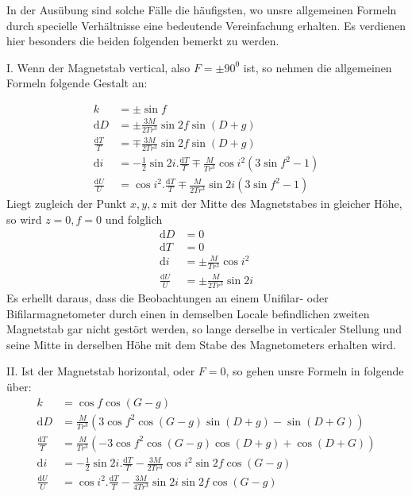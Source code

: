 In der Ausübung sind solche Fälle die häufigsten, wo unsre allgemeinen Formeln durch specielle Verhältnisse eine bedeutende Vereinfachung erhalten. Es verdienen hier besonders die beiden folgenden bemerkt zu werden.

I. Wenn der Magnetstab vertical, also $F=\pm90^0$ ist, so nehmen die allgemeinen Formeln folgende Gestalt an:
\par\clearpage
{}
\[
\begin{aligned}
k&=\pm\sin f\\
\mathrm{d}D&=\pm\frac{3M}{2Tr^3}\sin2f\sin(D+g)\\
\frac{\mathrm{d}T}{T}&=\mp\frac{3M}{2Tr^3}\sin2f\sin(D+g)\\
\mathrm{d}i&=-\tfrac12\sin2i.\frac{\mathrm{d}T}{T}\mp\frac{M}{Tr^3}\cos i^2(3\sin f^2-1)\\
\frac{\mathrm{d}U}{U}&=\cos i^2.\frac{\mathrm{d}T}{T}\mp\frac{M}{2Tr^3}\sin2i(3\sin f^2-1)
\end{aligned}
\]
Liegt zugleich der Punkt $x,y,z$ mit der Mitte des Magnetstabes in gleicher Höhe, so wird $z=0,f=0$ und folglich
\[
\begin{aligned}
\mathrm{d}D&=0\\
\mathrm{d}T&=0\\
\mathrm{d}i&=\pm\frac{M}{Tr^3}\cos i^2\\
\frac{\mathrm{d}U}{U}&=\pm\frac{M}{2Tr^3}\sin2i
\end{aligned}
\]
Es erhellt daraus, dass die Beobachtungen an einem Unifilar- oder Bifilarmagnetometer durch einen in demselben Locale befindlichen zweiten Magnetstab gar nicht gestört werden, so lange derselbe in verticaler Stellung und seine Mitte in derselben Höhe mit dem Stabe des Magnetometers erhalten wird.

II. Ist der Magnetstab horizontal, oder $F=0$, so gehen unsre Formeln in folgende über:
\[
\begin{aligned}
k&=\cos f\cos(G-g)\\
\mathrm{d}D&=\frac{M}{Tr^3}(3\cos f^2\cos(G-g)\sin(D+g)-\sin(D+G))\\
\frac{\mathrm{d}T}{T}&=\frac{M}{Tr^3}(-3\cos f^2\cos(G-g)\cos(D+g)+\cos(D+G))\\
\mathrm{d}i&=-\tfrac12\sin2i.\frac{\mathrm{d}T}{T}-\frac{3M}{2Tr^3}\cos i^2\sin2f\cos(G-g)\\
\frac{\mathrm{d}U}{U}&=\cos i^2.\frac{\mathrm{d}T}{T}-\frac{3M}{4Tr^3}\sin2i\sin2f\cos(G-g)
\end{aligned}
\]

